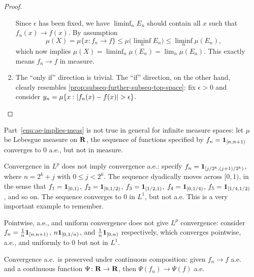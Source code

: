 \begin{proof}
\begin{enumerate}
        Since $\epsilon$ has been fixed, we have $\liminf_n E_n$ should contain all $x$ such that $f_n(x) \to f(x)$. By assumption \[\mu(X) = \mu\{x:f_n \to f\} \leq \mu\bigl(\liminf_n E_n\bigr) \leq \liminf_n \mu(E_n),\] which now implies $\mu(X) = \liminf_n \mu(E_n) = \lim_n \mu(E_n)$. This exactly means $f_n \to f$ in measure.
        \item The ``only if'' direction is trivial. The ``if'' direction, on the other hand, clearly resembles \cref{prop:subseq-further-subseq-top-space}: fix $\epsilon > 0$ and consider $y_n = \mu\{x:\lvert f_n(x) - f(x) \rvert > \epsilon\}$. \qedhere
     \end{enumerate}
\end{proof}

\begin{exa}
    Part~\ref{enu:ae-implies-meas} is not true in general for infinite measure spaces: let $\mu$ be Lebesgue measure on $\mathbf{R}$, the sequence of functions specified by $f_n = \mathbf{1}_{[n,n+1)}$ converges to $0$ a.e., but not in measure.

    Convergence in $L^p$ does not imply convergence a.e.: specify $f_n =\mathbf{1}_{[j/2^k,(j+1)/2^k)}$, where $n = 2^k+j$ with $0\leq j < 2^k$. The sequence dyadically moves across $[0,1)$, in the sense that $f_1 = \mathbf{1}_{[0,1)}$, $f_2 = \mathbf{1}_{[0,1/2)}$, $f_3 = \mathbf{1}_{[1/2,1)}$, $f_4 = \mathbf{1}_{[0,1/4)}$, $f_5 = \mathbf{1}_{[1/4,1/2)}$, and so on. The sequence converges to $0$ in $L^1$, but not a.e. This is a very important example to remember.

    Pointwise, a.e., and uniform convergence does not give $L^p$ convergence: consider $f_n = \frac{1}{n} \mathbf{1}_{[n,n+1)}$, $n\mathbf{1}_{[0,1/n)}$, and $\frac{1}{n} \mathbf{1}_{[0,n)}$ respectively, which converges pointwise, a.e., and uniformly to $0$ but not in $L^1$.
\end{exa}

\begin{fact}
    Convergence a.e.\ is preserved under continuous composition: given $f_n \to f$ a.e. and a continuous function $\Psi\colon \mathbf{R} \to \mathbf{R}$, then $\Psi(f_n)\to \Psi(f)$ a.e.
\end{fact}

